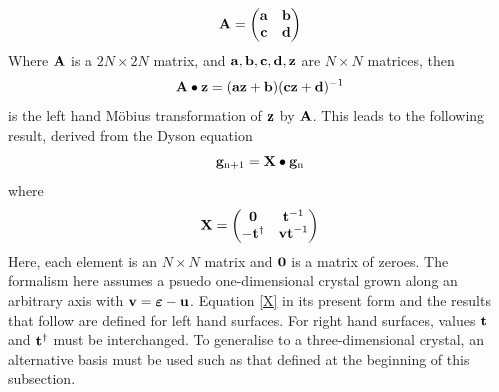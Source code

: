 \documentclass[a4paper, 12pt]{article}
\begin{document}
\begin{equation}
\bf{A} = \begin{pmatrix} \bf{a}&\bf{b}\\ \bf{c}&\bf{d} \end{pmatrix}
\end{equation}
Where $\bf{A}$ is a $2N \times 2N$ matrix, and $\bf{a}, \bf{b}, \bf{c}, \bf{d}, \bf{z}$ are $N \times N$ matrices, then
\begin{equation}\label{LHMT}
\bf{A \bullet z} = (\bf{az} + \bf{b})(\bf{cz} + \bf{d})^{\rm -1}
\end{equation}
is the left hand M\"{o}bius transformation of $\bf z$ by $\bf A$.
This leads to the following result, derived from the Dyson equation
\begin{equation}
	{\bf g}_{{\rm n}+1} = {\bf X}\bullet {\bf g}_{\rm n}
\end{equation}
where
\begin{equation}\label{X}
	\bf{X} = \begin{pmatrix} \bf0&\bf{t}^{\rm{-1}}\\-\bf{t}^{\rm{\dag}}&\bf{vt}^{\rm{-1}} \end{pmatrix}
\end{equation}
Here, each element is an $N \times N$ matrix and $\bf{0}$ is a matrix of zeroes. The formalism here assumes a psuedo one-dimensional crystal grown along an arbitrary axis with ${\bf v} = \bm\varepsilon - {\bf u}$. Equation \eqref{X} in its present form and the results that follow are defined for left hand surfaces. For right hand surfaces, values $\bf{t}$ and $\bf{t}^{\rm{\dag}}$ must be interchanged.
To generalise to a three-dimensional crystal, an alternative basis must be used such as that defined at the beginning of this subsection.

\end{document}
